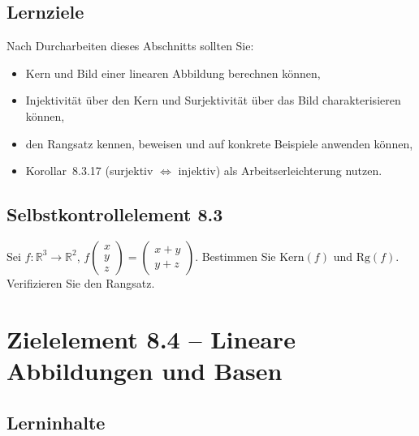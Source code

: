\documentclass[a4paper,12pt]{article}
\begin{document}
\subsection*{Lernziele}

Nach Durcharbeiten dieses Abschnitts sollten Sie:
\begin{itemize}
  \item Kern und Bild einer linearen Abbildung berechnen können,
  \item Injektivität über den Kern und Surjektivität über das Bild charakterisieren können,
  \item den Rangsatz kennen, beweisen und auf konkrete Beispiele anwenden können,
  \item Korollar~8.3.17 (surjektiv $\Leftrightarrow$ injektiv) als Arbeitserleichterung nutzen.
\end{itemize}

\subsection*{Selbstkontrollelement 8.3}

Sei $f: \mathbb{R}^3 \to \mathbb{R}^2$, $f\!\begin{pmatrix}x\\y\\z\end{pmatrix} = \begin{pmatrix}x+y\\y+z\end{pmatrix}$.
Bestimmen Sie $\mathrm{Kern}(f)$ und $\mathrm{Rg}(f)$. Verifizieren Sie den Rangsatz.

\newpage

\section*{Zielelement 8.4 -- Lineare Abbildungen und Basen}

\subsection*{Lerninhalte}

\begin{center}
\end{center}
\end{document}
